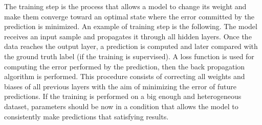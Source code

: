 \documentclass[12pt]{report}
\begin{document}
The training step is the process that allows a model to change its weight and make them converge toward an optimal state where the error committed by the prediction is minimized. An example of training step is the following. The model receives an input sample and propagates it through all hidden layers. Once the data reaches the output layer, a prediction is computed and later compared with the ground truth label (if the training is supervised). A loss function is used for computing the error performed by the prediction, then the back propagation algorithm is performed. This procedure consists of correcting all weights and biases of all previous layers with the aim of minimizing the error of future predictions. If the training is performed on a big enough and heterogeneous dataset, parameters should be now in a condition that allows the model to consistently make predictions that satisfying results.\\
\end{document}
